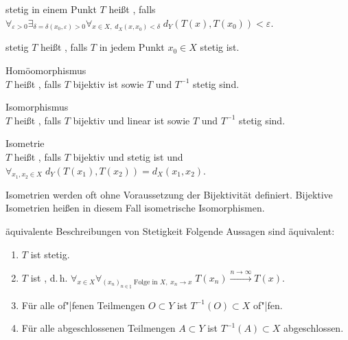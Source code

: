 \begin{Def}{stetig in einem Punkt}
    $T$ heißt , falls\\
    $\forall_{\varepsilon > 0} \exists_{\delta = \delta(x_0, \varepsilon) > 0}
    \forall_{x \in X,\; d_X(x, x_0) < \delta}\; d_Y(T(x), T(x_0)) < \varepsilon$.
\end{Def}

\begin{Def}{stetig}
    $T$ heißt , falls $T$ in jedem Punkt $x_0 \in X$ stetig ist.
\end{Def}

\begin{Def}{Homöomorphismus}\\
    $T$ heißt , falls $T$ bijektiv ist sowie $T$ und $T^{-1}$ stetig sind.
\end{Def}

\begin{Def}{Isomorphismus}\\
    $T$ heißt , falls $T$ bijektiv und linear ist sowie
    $T$ und $T^{-1}$ stetig sind.
\end{Def}

\begin{Def}{Isometrie}\\
    $T$ heißt , falls $T$ bijektiv und stetig ist und
    $\forall_{x_1, x_2 \in X}\; d_Y(T(x_1), T(x_2)) = d_X(x_1, x_2)$.
\end{Def}

\begin{Bem}
    Isometrien werden oft ohne Voraussetzung der Bijektivität definiert.
    Bijektive Isometrien heißen in diesem Fall isometrische Isomorphismen.
\end{Bem}

\linie

\begin{Satz}{äquivalente Beschreibungen von Stetigkeit}
    Folgende Aussagen sind äquivalent:
    \begin{enumerate}
        \item
        $T$ ist stetig.
        
        \item
        $T$ ist ,
        d.\,h. $\forall_{x \in X}
        \forall_{(x_n)_{n \in \natural} \text{ Folge in } X,\; x_n \to x}\;
        T(x_n) \xrightarrow{n \to \infty} T(x)$.
        
        \item
        Für alle of"|fenen Teilmengen $O \subset Y$ ist $T^{-1}(O) \subset X$ of"|fen.
        
        \item
        Für alle abgeschlossenen Teilmengen $A \subset Y$ ist $T^{-1}(A) \subset X$ abgeschlossen.
    \end{enumerate}
\end{Satz}

